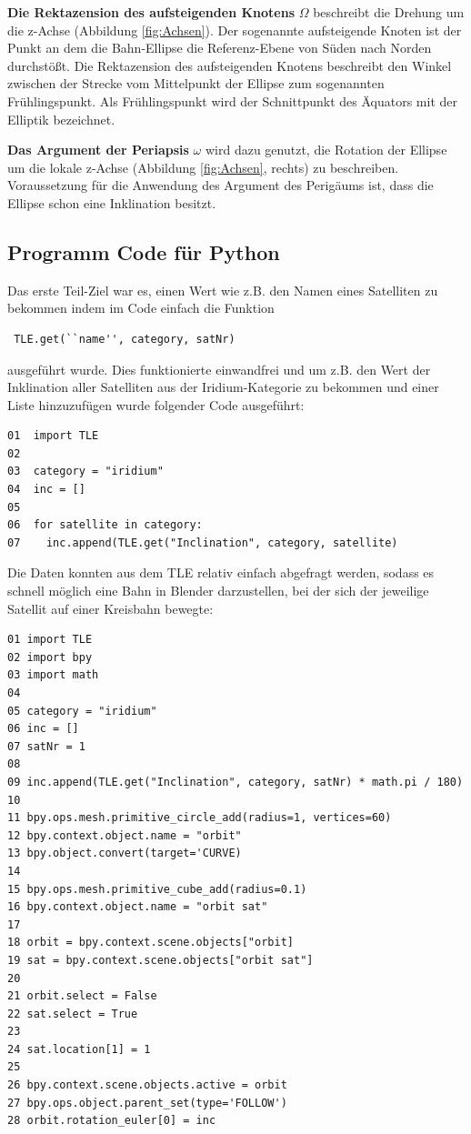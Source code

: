 \textbf{Die Rektazension des aufsteigenden Knotens} \( \Omega \) beschreibt die Drehung um die z-Achse
(Abbildung \ref{fig:Achsen}).
Der sogenannte aufsteigende Knoten ist der Punkt an dem die Bahn-Ellipse die Referenz-Ebene von
Süden nach Norden durchstößt. Die Rektazension des aufsteigenden Knotens beschreibt den Winkel
zwischen der Strecke vom Mittelpunkt der Ellipse zum sogenannten Frühlingspunkt.
Als Frühlingspunkt wird der Schnittpunkt des Äquators mit der Elliptik bezeichnet.
\\\par

\textbf{Das Argument der Periapsis} \( \omega \) wird dazu genutzt, die Rotation der Ellipse um
die lokale z-Achse (Abbildung \ref{fig:Achsen}, rechts) zu beschreiben. Voraussetzung für die
Anwendung des Argument des Perigäums ist, dass die Ellipse schon eine Inklination besitzt.
\\\par

\newpage
\subsection{Programm Code für Python} \label{Code}

Das erste Teil-Ziel war es, einen Wert wie z.B. den Namen eines Satelliten zu bekommen indem
im Code einfach die Funktion 

\begin{verbatim}
 TLE.get(``name'', category, satNr)
\end{verbatim}

ausgeführt wurde. Dies funktionierte einwandfrei und um z.B. den Wert der Inklination aller
Satelliten aus der Iridium-Kategorie zu bekommen und einer Liste hinzuzufügen wurde folgender
Code ausgeführt:

\begin{verbatim}
01  import TLE
02  
03  category = "iridium"
04  inc = []
05  
06  for satellite in category:
07    inc.append(TLE.get("Inclination", category, satellite)
\end{verbatim}

Die Daten konnten aus dem TLE relativ einfach abgefragt werden, sodass es schnell
möglich eine Bahn in Blender darzustellen, bei der sich der jeweilige Satellit auf
einer Kreisbahn bewegte:

\begin{verbatim}
01 import TLE
02 import bpy
03 import math
04 
05 category = "iridium"
06 inc = []
07 satNr = 1
08 
09 inc.append(TLE.get("Inclination", category, satNr) * math.pi / 180)
10 
11 bpy.ops.mesh.primitive_circle_add(radius=1, vertices=60)
12 bpy.context.object.name = "orbit"
13 bpy.object.convert(target='CURVE)
14 
15 bpy.ops.mesh.primitive_cube_add(radius=0.1)
16 bpy.context.object.name = "orbit sat"
17 
18 orbit = bpy.context.scene.objects["orbit]
19 sat = bpy.context.scene.objects["orbit sat"]
20 
21 orbit.select = False
22 sat.select = True
23 
24 sat.location[1] = 1
25
26 bpy.context.scene.objects.active = orbit
27 bpy.ops.object.parent_set(type='FOLLOW')
28 orbit.rotation_euler[0] = inc
 
\end{verbatim}

